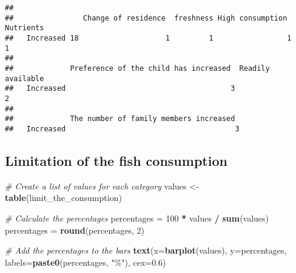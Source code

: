 \documentclass[
]{article}
\newenvironment{Shaded}{\begin{snugshade}}{\end{snugshade}}
\newcommand{\AttributeTok}[1]{\textcolor[rgb]{0.13,0.29,0.53}{#1}}
\newcommand{\CommentTok}[1]{\textcolor[rgb]{0.56,0.35,0.01}{\textit{#1}}}
\newcommand{\DecValTok}[1]{\textcolor[rgb]{0.00,0.00,0.81}{#1}}
\newcommand{\FloatTok}[1]{\textcolor[rgb]{0.00,0.00,0.81}{#1}}
\newcommand{\FunctionTok}[1]{\textcolor[rgb]{0.13,0.29,0.53}{\textbf{#1}}}
\newcommand{\NormalTok}[1]{#1}
\newcommand{\OtherTok}[1]{\textcolor[rgb]{0.56,0.35,0.01}{#1}}
\newcommand{\SpecialCharTok}[1]{\textcolor[rgb]{0.81,0.36,0.00}{\textbf{#1}}}
\newcommand{\StringTok}[1]{\textcolor[rgb]{0.31,0.60,0.02}{#1}}
\begin{document}
\begin{Shaded}
\end{Shaded}

\begin{verbatim}
##            
##                Change of residence  freshness High consumption  Nutrients
##   Increased 18                    1         1                 1         1
##            
##             Preference of the child has increased  Readily available 
##   Increased                                      3                  2
##            
##             The number of family members increased 
##   Increased                                       3
\end{verbatim}

\hypertarget{limitation-of-the-fish-consumption}{%
\subsection{Limitation of the fish
consumption}\label{limitation-of-the-fish-consumption}}

\begin{Shaded}
\begin{Highlighting}[]
\CommentTok{\# Create a list of values for each category}
\NormalTok{values }\OtherTok{\textless{}{-}} \FunctionTok{table}\NormalTok{(limit\_the\_consumption)}

\CommentTok{\# Calculate the percentages}
\NormalTok{percentages }\OtherTok{=} \DecValTok{100} \SpecialCharTok{*}\NormalTok{ values }\SpecialCharTok{/} \FunctionTok{sum}\NormalTok{(values)}
\NormalTok{percentages }\OtherTok{=} \FunctionTok{round}\NormalTok{(percentages, }\DecValTok{2}\NormalTok{)}

\CommentTok{\# Add the percentages to the bars}
\FunctionTok{text}\NormalTok{(}\AttributeTok{x=}\FunctionTok{barplot}\NormalTok{(values), }\AttributeTok{y=}\NormalTok{percentages, }\AttributeTok{labels=}\FunctionTok{paste0}\NormalTok{(percentages, }\StringTok{"\%"}\NormalTok{), }\AttributeTok{cex=}\FloatTok{0.6}\NormalTok{)}
\end{Highlighting}
\end{Shaded}
\end{document}
